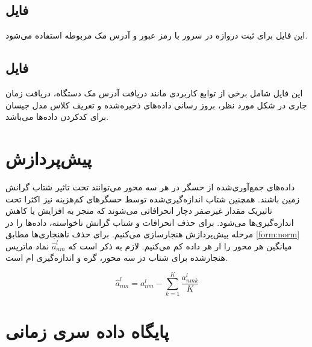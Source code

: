 \subsection{فایل }

این فایل برای ثبت دروازه در سرور با رمز عبور و آدرس مک مربوطه استفاده می‌شود.

\subsection{فایل }

این فایل شامل برخی از توابع کاربردی مانند دریافت آدرس مک دستگاه، دریافت زمان جاری در شکل مورد نظر، بروز رسانی داده‌های ذخیره‌شده و تعریف کلاس مدل جیسان برای کد‌کردن داده‌ها می‌باشد.

\section{پیش‌پردازش}

داده‌های جمع‌آوری‌شده از حسگر در هر سه محور می‌توانند تحت تاثیر شتاب گرانش زمین باشند. همچنین شتاب اندازه‌گیری‌شده توسط حسگرهای کم‌هزینه  نیز اکثرا تحت تاثیریک مقدار غیرصفر دچار انحرافاتی می‌شوند که منجر به افزایش یا کاهش اندازه‌گیری‌ها می‌شود\cite{jung2017vibration}. برای حذف انحرافات و شتاب گرانش ناخواسته، داده‌ها را در مرحله پیش‌پردازش هنجارسازی می‌کنیم. برای حذف ناهنجاری‌ها مطابق \cref{form:norm} میانگین هر محور را ار هر داده کم می‌کنیم. لازم به ذکر است که $\hat{a}^l_{nm}$ نماد ماتریس هنجارشده برای شتاب در سه محور، گره  و اندازه‌گیری ام است.

\begin{equation}
\label{form:norm}
\hat{a}^l_{nm}=a^l_{nm}-\sum_{k=1}^K \dfrac{a^l_{nmk}}{K}
\end{equation}

\section{پایگاه داده سری زمانی}




